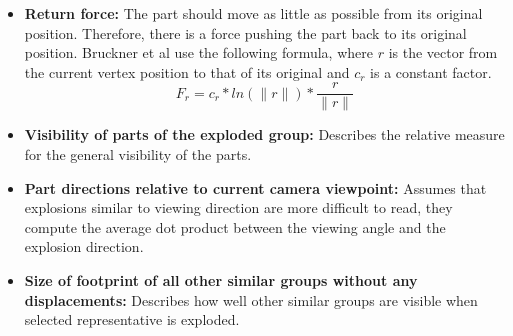 \begin{itemize}
	\item \textbf{Return force:} The part should move as little as possible from its original position. Therefore, there is a force pushing the part back to its original position. Bruckner et al use the following formula, where $r$ is the vector from the current vertex position to that of its original and $c_r$ is a constant factor. 
	\begin{equation}
		F_r = c_r * ln(\|r\|) * \frac{r}{\|r\|}
		\label{eq:returnforce}
	\end{equation}
	
	\item \textbf{Visibility of parts of the exploded group:} Describes the relative measure for the general visibility of the parts.
	\item \textbf{Part directions relative to current camera viewpoint:} Assumes that explosions similar to viewing direction are more difficult to read, they compute the average dot product between the viewing angle and the explosion direction.
	\item \textbf{Size of footprint of all other similar groups without any displacements:} Describes how well other similar groups are visible when selected representative is exploded.
\end{itemize}










